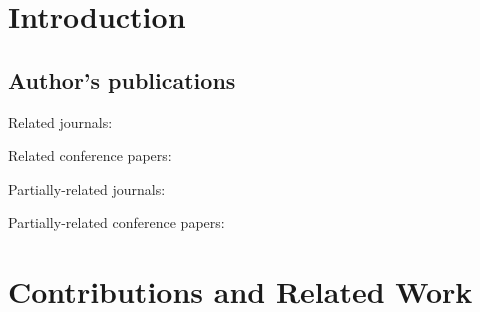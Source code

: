 \documentclass[a4paper,11pt,titlepage,twoside]{book}
\newcommand{\chapternoclear}[1]{
  \begingroup
  \let\cleardoublepage\clearpage
  \chapter{#1}
  \endgroup
}
\newcommand{\conditionalClearPage}{
  \ifdefined\printversion
  \clearemptydoublepage
  \else
  \newpage{}
  \clearpage
  \fi
}
\begin{document}


\conditionalClearPage


\conditionalClearPage


\conditionalClearPage


\pagestyle{fancy}

\conditionalClearPage
\tableofcontents



\chapternoclear{Introduction}


\section{Author's publications}

Related journals:
\cite{baca2018rospix}
\cite{baca2019autonomous}
\cite{spurny2019cooperative}
\cite{saska2017system}
\cite{giernacki2019realtime}
\cite{chudoba2016exploration}
\cite{saska2020formation}
\cite{loianno2018localization}
\cite{petrlik2020robust}
\cite{stibinger2020localization}
\cite{saikin2020wildfire}
\cite{baca2020mrs}
\cite{petracek2020bioinspired}
\cite{kratky2020autonomous2}
\cite{stasinchuk2020multiuav}
\cite{dmytruk2020safe}
\cite{smrcka2020admittance}
\cite{walter2020extinguishing}
\cite{silano2020power}

Related conference papers:
\cite{baca2019timepix}
\cite{baca2018model}
\cite{baca2016embedded}
\cite{baca2017autonomous}
\cite{saska2017documentation}
\cite{spurny2016complex}
\cite{faigl2017onsolution}
\cite{saska2016formations}
\cite{roucek2019darpa}
\cite{baca2020gamma}

Partially-related journals:
\cite{baca2016miniaturized}
\cite{baca2018timepix}
\cite{daniel2019inorbit}
\cite{urban2017vzlusat}

Partially-related conference papers:
\cite{daniel2016terrestrial}
\cite{daniel2017xray}





\chapternoclear{Contributions and Related Work}


\end{document}
